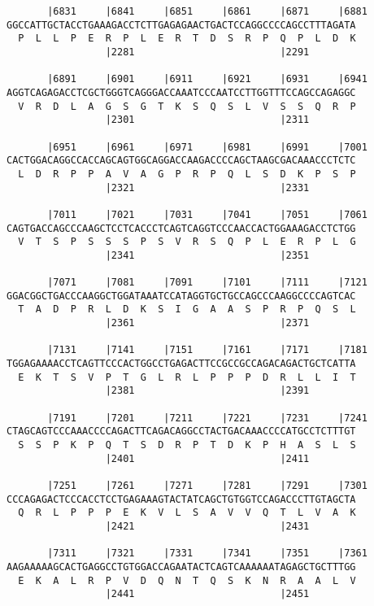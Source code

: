 \documentclass{article}
\begin{document}
\begin{Verbatim}
       |6831     |6841     |6851     |6861     |6871     |6881
GGCCATTGCTACCTGAAAGACCTCTTGAGAGAACTGACTCCAGGCCCCAGCCTTTAGATA
  P  L  L  P  E  R  P  L  E  R  T  D  S  R  P  Q  P  L  D  K
                 |2281                         |2291        
  
       |6891     |6901     |6911     |6921     |6931     |6941
AGGTCAGAGACCTCGCTGGGTCAGGGACCAAATCCCAATCCTTGGTTTCCAGCCAGAGGC
  V  R  D  L  A  G  S  G  T  K  S  Q  S  L  V  S  S  Q  R  P
                 |2301                         |2311        
  
       |6951     |6961     |6971     |6981     |6991     |7001
CACTGGACAGGCCACCAGCAGTGGCAGGACCAAGACCCCAGCTAAGCGACAAACCCTCTC
  L  D  R  P  P  A  V  A  G  P  R  P  Q  L  S  D  K  P  S  P
                 |2321                         |2331        
  
       |7011     |7021     |7031     |7041     |7051     |7061
CAGTGACCAGCCCAAGCTCCTCACCCTCAGTCAGGTCCCAACCACTGGAAAGACCTCTGG
  V  T  S  P  S  S  S  P  S  V  R  S  Q  P  L  E  R  P  L  G
                 |2341                         |2351        
  
       |7071     |7081     |7091     |7101     |7111     |7121
GGACGGCTGACCCAAGGCTGGATAAATCCATAGGTGCTGCCAGCCCAAGGCCCCAGTCAC
  T  A  D  P  R  L  D  K  S  I  G  A  A  S  P  R  P  Q  S  L
                 |2361                         |2371        
  
       |7131     |7141     |7151     |7161     |7171     |7181
TGGAGAAAACCTCAGTTCCCACTGGCCTGAGACTTCCGCCGCCAGACAGACTGCTCATTA
  E  K  T  S  V  P  T  G  L  R  L  P  P  P  D  R  L  L  I  T
                 |2381                         |2391        
  
       |7191     |7201     |7211     |7221     |7231     |7241
CTAGCAGTCCCAAACCCCAGACTTCAGACAGGCCTACTGACAAACCCCATGCCTCTTTGT
  S  S  P  K  P  Q  T  S  D  R  P  T  D  K  P  H  A  S  L  S
                 |2401                         |2411        
  
       |7251     |7261     |7271     |7281     |7291     |7301
CCCAGAGACTCCCACCTCCTGAGAAAGTACTATCAGCTGTGGTCCAGACCCTTGTAGCTA
  Q  R  L  P  P  P  E  K  V  L  S  A  V  V  Q  T  L  V  A  K
                 |2421                         |2431        
  
       |7311     |7321     |7331     |7341     |7351     |7361
AAGAAAAAGCACTGAGGCCTGTGGACCAGAATACTCAGTCAAAAAATAGAGCTGCTTTGG
  E  K  A  L  R  P  V  D  Q  N  T  Q  S  K  N  R  A  A  L  V
                 |2441                         |2451        
  

\end{Verbatim}
\end{document}
